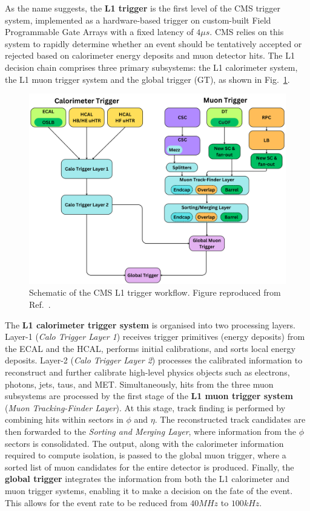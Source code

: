 As the name suggests, the \textbf{L1 trigger} is the first level of the CMS trigger system, implemented as a hardware-based trigger on custom-built Field Programmable Gate Arrays with a fixed latency of $4\unit{\mu s}$. CMS relies on this system to rapidly determine whether an event should be tentatively accepted or rejected based on calorimeter energy deposits and muon detector hits. The L1 decision chain comprises three primary subsystems: the L1 calorimeter system, the L1 muon trigger system and the global trigger (GT), as shown in Fig.~\ref{Figure:Chapter3_CMS_L1_Trigger}.

\begin{figure}[h]
\centering
\includegraphics[width= 1.0\textwidth]{Figures/Chapter3/CMS_L1_Trigger.pdf}
\caption[Schematic of the CMS L1 trigger workflow]{Schematic of the CMS L1 trigger workflow. Figure reproduced from Ref.~\cite{CMS_L1_Trigger}.}
\label{Figure:Chapter3_CMS_L1_Trigger}
\end{figure}

The \textbf{L1 calorimeter trigger system} is organised into two processing layers. Layer-1 (\textit{Calo Trigger Layer 1}) receives trigger primitives (energy deposits) from the ECAL and the HCAL, performs initial calibrations, and sorts local energy deposits. Layer-2 (\textit{Calo Trigger Layer 2}) processes the calibrated information to reconstruct and further calibrate high-level physics objects such as electrons, photons, jets, taus, and MET. Simultaneously, hits from the three muon subsystems are processed by the first stage of the \textbf{L1 muon trigger system} (\textit{Muon Tracking-Finder Layer}). At this stage, track finding is performed by combining hits within sectors in $\phi$ and $\eta$. The reconstructed track candidates are then forwarded to the \textit{Sorting and Merging Layer}, where information from the $\phi$ sectors is consolidated. The output, along with the calorimeter information required to compute isolation, is passed to the global muon trigger, where a sorted list of muon candidates for the entire detector is produced. Finally, the \textbf{global trigger} integrates the information from both the L1 calorimeter and muon trigger systems, enabling it to make a decision on the fate of the event. This allows for the event rate to be reduced from $40\unit{MHz}$ to $100\unit{kHz}$.

